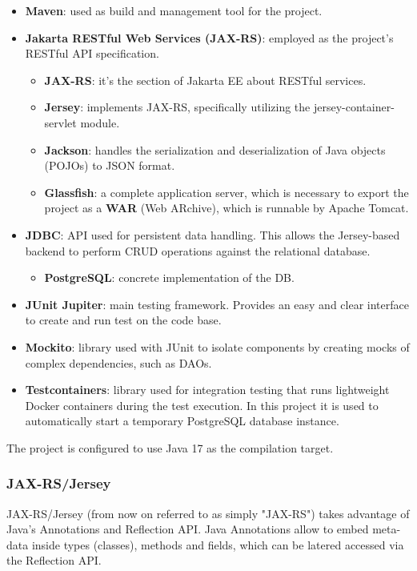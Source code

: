 \begin{itemize}
	\item \textbf{Maven}: used as build and management tool for the project. 
	\item \textbf{Jakarta RESTful Web Services (JAX-RS)}: employed as the project's RESTful API specification.
	\begin{itemize}
		\item \textbf{JAX-RS}: it's the section of Jakarta EE about RESTful services.
		\item \textbf{Jersey}: implements JAX-RS, specifically utilizing the jersey-container-servlet module.
		\item \textbf{Jackson}: handles the serialization and deserialization of Java objects (POJOs) to JSON format.
		\item \textbf{Glassfish}: a complete application server, which is necessary to export the project as a \textbf{WAR} (Web ARchive), which is runnable by Apache Tomcat.
	\end{itemize}
	\item \textbf{JDBC}: API used for persistent data handling. This allows the Jersey-based backend to perform CRUD operations against the relational database.
	\begin{itemize}
		\item \textbf{PostgreSQL}: concrete implementation of the DB.
	\end{itemize}
	\item \textbf{JUnit Jupiter}: main testing framework. Provides an easy and clear interface to create and run test on the code base.
	\item \textbf{Mockito}: library used with JUnit to isolate components by creating mocks of complex dependencies, such as DAOs.
	\item \textbf{Testcontainers}: library used for integration testing that runs lightweight Docker containers during the test execution. In this project it is used to automatically start a temporary PostgreSQL database instance.
\end{itemize}

\noindent The project is configured to use Java 17 as the compilation target.

\subsubsection{JAX-RS/Jersey}

JAX-RS/Jersey (from now on referred to as simply "JAX-RS") takes advantage of Java's Annotations and Reflection API. Java Annotations allow to embed meta-data inside types (classes), methods and fields, which can be latered accessed via the Reflection API.



